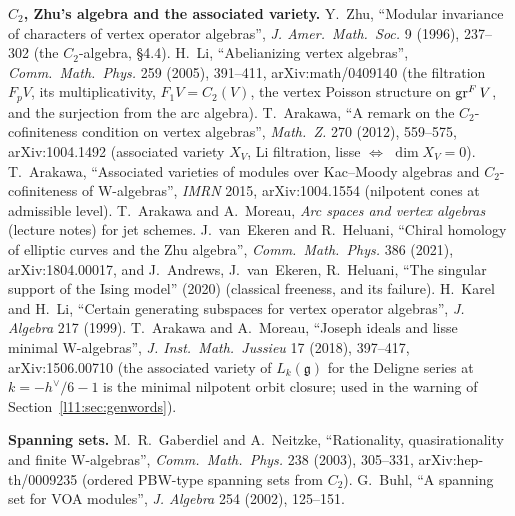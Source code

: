 \textbf{$C_2$, Zhu's algebra and the associated variety.} Y.~Zhu, ``Modular invariance of characters of vertex operator algebras'',
\emph{J. Amer.\ Math.\ Soc.} 9 (1996), 237--302 (the $C_2$-algebra, §4.4). H.~Li, ``Abelianizing vertex algebras'', \emph{Comm.\
Math.\ Phys.} 259 (2005), 391--411, arXiv:math/0409140 (the filtration $F_pV$, its multiplicativity, $F_1V = C_2(V)$, the vertex
Poisson structure on $\operatorname{gr}^FV$, and the surjection from the arc algebra). T.~Arakawa, ``A remark on the $C_2$-cofiniteness
condition on vertex algebras'', \emph{Math.\ Z.} 270 (2012), 559--575, arXiv:1004.1492 (associated variety $X_V$, Li filtration,
lisse $\Leftrightarrow$ $\dim X_V = 0$). T.~Arakawa, ``Associated varieties of modules over Kac--Moody algebras and
$C_2$-cofiniteness of W-algebras'', \emph{IMRN} 2015, arXiv:1004.1554 (nilpotent cones at admissible level). T.~Arakawa and
A.~Moreau, \emph{Arc spaces and vertex algebras} (lecture notes) for jet schemes. J.~van~Ekeren and R.~Heluani, ``Chiral homology
of elliptic curves and the Zhu algebra'', \emph{Comm.\ Math.\ Phys.} 386 (2021), arXiv:1804.00017, and J.~Andrews, J.~van~Ekeren,
R.~Heluani, ``The singular support of the Ising model'' (2020) (classical freeness, and its failure).
H.~Karel and H.~Li, ``Certain generating subspaces for vertex operator algebras'', \emph{J. Algebra} 217 (1999). T.~Arakawa and A.~Moreau, ``Joseph ideals and lisse minimal W-algebras'', \emph{J. Inst.\ Math.\ Jussieu} 17 (2018),
397--417, arXiv:1506.00710 (the associated variety of $L_k(\mathfrak g)$ for the Deligne series at $k=-h^\vee/6-1$ is the minimal
nilpotent orbit closure; used in the warning of Section~\ref{l11:sec:genwords}).

\textbf{Spanning sets.} M.~R.~Gaberdiel and A.~Neitzke, ``Rationality, quasirationality and finite W-algebras'', \emph{Comm.\
Math.\ Phys.} 238 (2003), 305--331, arXiv:hep-th/0009235 (ordered PBW-type spanning sets from $C_2$). G.~Buhl, ``A spanning set
for VOA modules'', \emph{J. Algebra} 254 (2002), 125--151.


